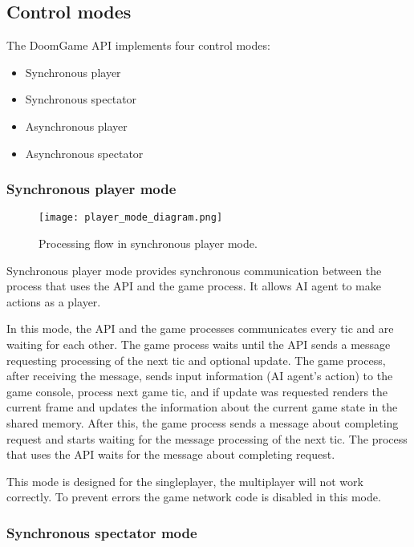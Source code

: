 \subsection{Control modes}\label{sec:architecture_modes}

The DoomGame API implements four control modes:
    
    \begin{itemize}
    \item Synchronous player
    \item Synchronous spectator
    \item Asynchronous player
    \item Asynchronous spectator
    \end{itemize}
    
    \subsubsection{Synchronous player mode}\label{sec:architecture_player_mode}
    
        \begin{figure}
			    \centering
			    \texttt{[image: player\_mode\_diagram.png]}
			    \caption{Processing flow in synchronous player mode.}\label{fig:player_mode_diagram}
	    \end{figure}
        
	    Synchronous player mode provides synchronous communication between the process that uses the API and the game process. It allows AI agent to make actions as a player. 
	    
	    In this mode, the API and the game processes communicates every tic and are waiting for each other. The game process waits until the API sends a message requesting processing of the next tic and optional update. The game process, after receiving the message, sends input information (AI agent's action) to the game console, process next game tic, and if update was requested renders the current frame and updates the information about the current game state in the shared memory. After this, the game process sends a message about completing request and starts waiting for the message processing of the next tic. The process that uses the API waits for the message about completing request.
	    
	    This mode is designed for the singleplayer, the multiplayer will not work correctly. To prevent errors the game network code is disabled in this mode.

    \subsubsection{Synchronous spectator mode}\label{sec:architecture_spectator_mode}

